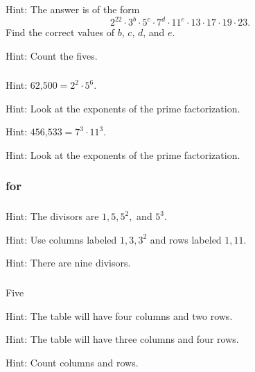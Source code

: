 \subsubsection*{ \answers}
\begin{apart}
    \item Hint: The answer is of the form $$2^{22} \cdot 3^b \cdot 5^c \cdot 7^d \cdot 11^e \cdot 13 \cdot 17 \cdot 19 \cdot 23.$$  Find the correct values of $b$, $c$, $d$, and $e$.
    \item Hint: Count the fives.
\end{apart}

\subsubsection*{ \answers}
\begin{apart}
    \item Hint: $\text{62,500}=2^2 \cdot 5^6$.
    \item Hint: Look at the exponents of the prime factorization.
    \item Hint: $\text{456,533} = 7^3 \cdot 11^3$.
    \item Hint: Look at the exponents of the prime factorization.
\end{apart}

\subsubsection{\answers for  \subcountdiv}

\subsubsection*{ \answers}
\begin{apart}
    \item Hint: The divisors are $1, 5, 5^2,$ and $5^3$.
    \item Hint: Use columns labeled $1, 3, 3^2$ and rows labeled $1, 11$.
    \item Hint: There are nine divisors.
\end{apart}

\subsubsection*{ \answers}
\begin{apart}
    \item Five
    \item Hint: The table will have four columns and two rows.
    \item Hint: The table will have three columns and four rows.
    \item Hint: Count columns and rows.
\end{apart}


